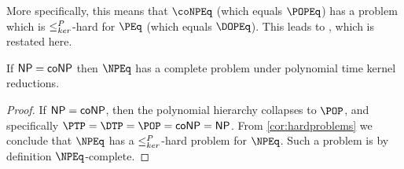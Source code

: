 More specifically, this means that $\coNPEq$ (which equals $\POPEq$) has a problem which is $\leq^{P}_{ker}$-hard for $\PEq$ (which equals $\DOPEq$).
This leads to \autocite[Theorem~8.7, part~1]{bcffm}, which is restated here.

\begin{corollary}
  If ${\mathsf{NP}} = {\mathsf{coNP}}$ then $\NPEq$ has a complete problem under polynomial time kernel reductions.
\end{corollary}
\begin{proof}
  If ${\mathsf{NP}} = {\mathsf{coNP}}$, then the polynomial hierarchy collapses to $\POP$, and specifically $\PTP = \DTP = \POP = \coNP = \NP$.
  From \autoref{cor:hardproblems} we conclude that $\NPEq$ has a $\leq^{P}_{ker}$-hard problem for $\NPEq$.
  Such a problem is by definition $\NPEq$-complete.
\end{proof}


